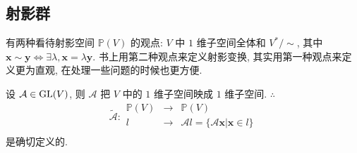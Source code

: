 \documentclass{ctexart}
\begin{document}
\subsection{射影群}
有两种看待射影空间 $\mathbb{P}(V)$ 的观点: $V$ 中 $1$ 维子空间全体和 $V^*/\sim$, 其中 $\boldsymbol{x}\sim\boldsymbol{y}\Leftrightarrow\exists\lambda,\boldsymbol{x}=\lambda\boldsymbol{y}$. 书上用第二种观点来定义射影变换, 其实用第一种观点来定义更为直观, 在处理一些问题的时候也更方便.

设 $\mathcal{A}\in\operatorname{GL} (V)$, 则 $\mathcal{A}$ 把 $V$ 中的 $1$ 维子空间映成 $1$ 维子空间. $\therefore$
\[\widetilde{\mathcal{A}}:\begin{array}{rcl}
    \mathbb{P}(V) & \to & \mathbb{P}(V) \\
    l & \to & \mathcal{A}l=\{\mathcal{A}\boldsymbol{x}|\boldsymbol{x}\in l\} \\
\end{array}\]
是确切定义的.
\end{document}
